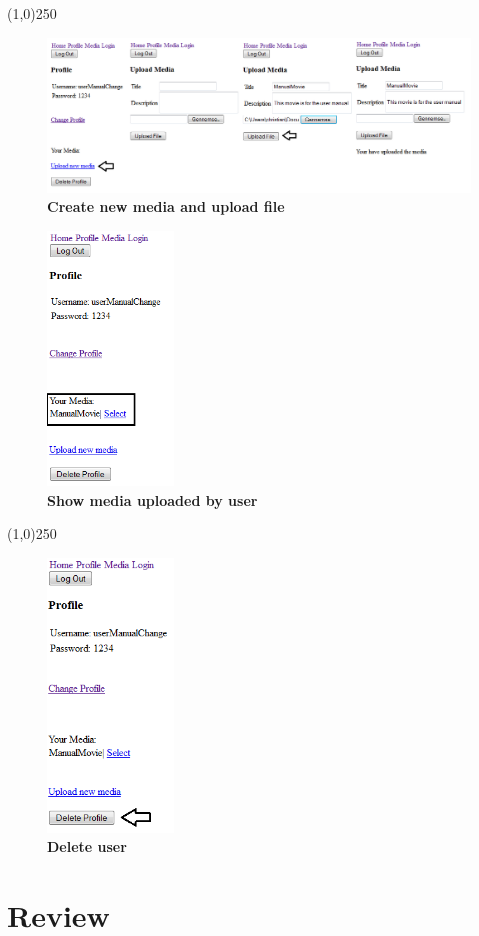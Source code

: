 \documentclass[11pt]{article}
\begin{document}
\begin{center}\line(1,0){250}\end{center}

\begin{figure}[H]
  \caption{\textbf{Create new media and upload file}}
  \centering
    \includegraphics[width=1\textwidth]{images/UM_create_media.png}
\end{figure}

\begin{figure}[H]
\centering
  \caption{\textbf{Show media uploaded by user}}
    \includegraphics[width=0.3\textwidth]{images/UM_show_media_by_user.png}
\end{figure}

\begin{center}\line(1,0){250}\end{center}

\begin{figure}[H]
\centering
  \caption{\textbf{Delete user}}
    \includegraphics[width=0.3\textwidth]{images/UM_delete_user.png}
\end{figure}

\newpage

\section{Review}
\end{document}
